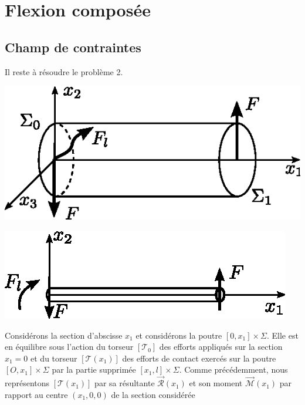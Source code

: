 \section{Flexion composée} \label{sec:Ch07-3}
\subsection{Champ de contraintes} \label{ssec:Ch07-3.1}
Il reste à résoudre le problème 2.
\begin{multicols}{2}
    \begin{center}
        \includegraphics{../images/T1_Ch07-18a}
    \end{center}
    \columnbreak
    \begin{center}
        \includegraphics{../images/T1_Ch07-18b}
    \end{center}
\end{multicols}
Considérons la section d'abscisse $x_1$ et considérons la poutre $\left[ 0,x_1 \right] \times \Sigma$.
Elle est en équilibre sous l'action du torseur $[\mathcal{T}_0]$ des efforts appliqués sur la section $x_1 = 0$ et du torseur $[\mathcal{T}(x_1)]$ des efforts de contact exercés sur la poutre  $[O,x_1]\times \Sigma$ par la partie supprimée $[x_1,l]\times \Sigma$.
Comme précédemment, nous représentons $[\mathcal{T}(x_1)]$ par sa  résultante $\vec{\mathcal{R}} (x_1)$ et son moment $\vec{\mathcal{M}} (x_1)$ par rapport au centre $(x_1,0,0)$ de la section considérée
